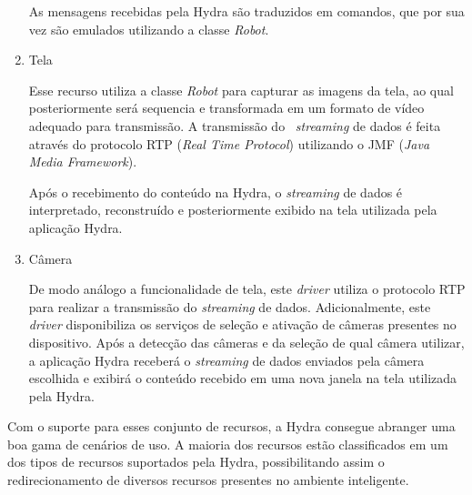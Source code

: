 \begin{enumerate}
	  		As mensagens recebidas pela Hydra são traduzidos em comandos, que por sua vez são emulados
	  		utilizando a classe \textit{Robot}.
	  		
	  \item Tela
	  	
	  		Esse recurso utiliza a classe \textit{Robot} para capturar as imagens da tela, ao qual
	  		posteriormente será sequencia e transformada em um formato de vídeo adequado para transmissão.
	  		A transmissão do ~\textit{streaming} de dados é feita através do protocolo RTP (\textit{Real
	  		Time Protocol}) utilizando o JMF (\textit{Java Media Framework}).

	  		Após o recebimento do conteúdo na Hydra, o \textit{streaming} de dados é interpretado, 
	  		reconstruído e posteriormente exibido na tela utilizada pela aplicação Hydra.
	  	
	  \item Câmera
	  
			De modo análogo a funcionalidade de tela, este \textit{driver} utiliza o protocolo RTP para
			realizar a transmissão do \textit{streaming} de dados. Adicionalmente, este \textit{driver}
			disponibiliza os serviços de seleção e ativação de câmeras presentes no dispositivo. Após a
			detecção das câmeras e da seleção de qual câmera utilizar, a aplicação Hydra receberá o
			\textit{streaming} de dados enviados pela câmera escolhida e exibirá o conteúdo recebido em uma
			nova janela na tela utilizada pela Hydra.
		
	\end{enumerate}
	
	Com o suporte para esses conjunto de recursos, a Hydra consegue abranger uma boa gama de
	cenários de uso. A maioria dos recursos estão classificados em um dos tipos de recursos
	suportados pela Hydra, possibilitando assim o redirecionamento de diversos recursos presentes no
	ambiente inteligente.
	
